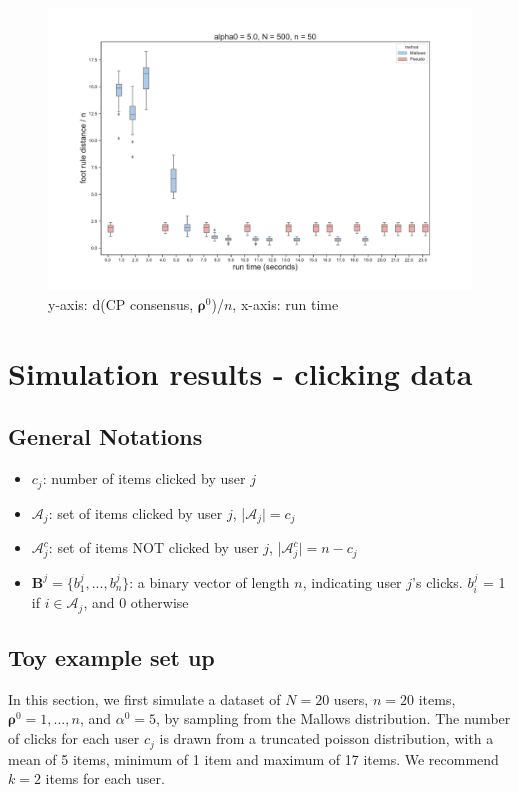 \documentclass[11pt, oneside]{article}   	%
\begin{document}
\begin{figure}[hbt!]
\begin{minipage}[t]{.32\linewidth}
	\end{minipage} 
	\begin{minipage}[t]{.32\linewidth}
	\centering
	\includegraphics[width=\linewidth]{figures/full_time_simulation/box_alpha05N500n50}
	\end{minipage} 

	\caption{y-axis: d(CP consensus, $\bm{\rho}^0$)/$n$, x-axis: run time}
	\label{fig:full_time_simulation}
\end{figure}


\section{Simulation results - clicking data}
\subsection{General Notations}

\begin{itemize}
	
	\item {$c_j$: number of items clicked by user $j$}
	\item {$\mathcal{A}_j$: set of items clicked by user $j$, |$\mathcal{A}_j| = c_j$}
	\item {$\mathcal{A}_j^c$: set of items NOT clicked by user $j$, |$\mathcal{A}_j^c| = n-c_j$ }
	\item {$\bm{B}^j = \{b^j_1, ..., b^j_n\}$: a binary vector of length $n$, indicating user $j$'s clicks. $b^j_i$ = 1 if $i \in \mathcal{A}_j$, and 0 otherwise}
	
\end{itemize}
\subsection{Toy example set up}
In this section, we first simulate a dataset of $N = 20$ users, $n = 20$ items, $\bm{\rho}^0 = 1, ..., n$, and $\alpha^0 = 5$, by sampling from the Mallows distribution. The number of clicks for each user $c_j$ is drawn from a truncated poisson distribution, with a mean of 5 items, minimum of 1 item and maximum of 17 items. We recommend $ k = 2$ items for each user.  
\end{document}
